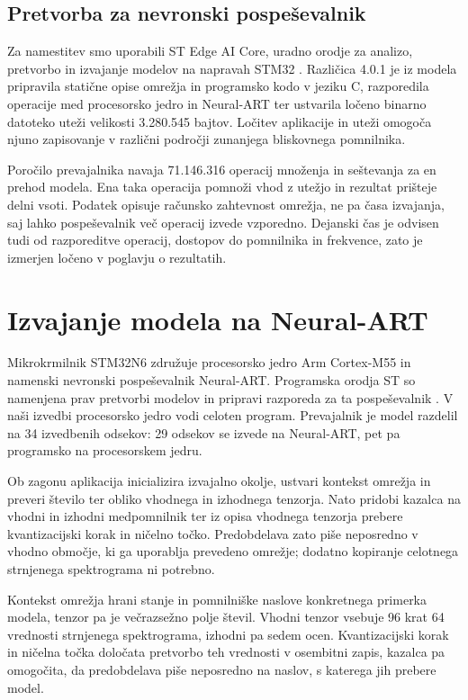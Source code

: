 \subsection{Pretvorba za nevronski pospeševalnik}

Za namestitev smo uporabili ST Edge AI Core, uradno orodje za analizo,
pretvorbo in izvajanje modelov na napravah STM32 \cite{st2026edgeai}. Različica
4.0.1 je iz modela pripravila statične opise omrežja in programsko kodo v
jeziku C, razporedila operacije med procesorsko jedro in Neural-ART ter
ustvarila ločeno binarno datoteko uteži velikosti 3.280.545 bajtov. Ločitev
aplikacije in uteži omogoča njuno zapisovanje v različni področji zunanjega
bliskovnega pomnilnika.

Poročilo prevajalnika navaja 71.146.316 operacij množenja in seštevanja za en
prehod modela. Ena taka operacija pomnoži vhod z utežjo in rezultat prišteje
delni vsoti. Podatek opisuje računsko zahtevnost omrežja, ne pa časa izvajanja,
saj lahko pospeševalnik več operacij izvede vzporedno. Dejanski čas je odvisen
tudi od razporeditve operacij, dostopov do pomnilnika in frekvence, zato je
izmerjen ločeno v poglavju o rezultatih.

\section{Izvajanje modela na Neural-ART}

Mikrokrmilnik STM32N6 združuje procesorsko jedro Arm Cortex-M55 in namenski
nevronski pospeševalnik Neural-ART. Programska orodja ST so namenjena prav
pretvorbi modelov in pripravi razporeda za ta pospeševalnik
\cite{st2026stm32n6ai}. V naši izvedbi procesorsko jedro vodi celoten program.
Prevajalnik je model razdelil na 34 izvedbenih odsekov: 29 odsekov se izvede na
Neural-ART, pet pa programsko na procesorskem jedru.

Ob zagonu aplikacija inicializira izvajalno okolje, ustvari kontekst omrežja in
preveri število ter obliko vhodnega in izhodnega tenzorja. Nato pridobi kazalca
na vhodni in izhodni medpomnilnik ter iz opisa vhodnega tenzorja prebere
kvantizacijski korak in ničelno točko. Predobdelava zato piše neposredno v
vhodno območje, ki ga uporablja prevedeno omrežje; dodatno kopiranje celotnega
strnjenega spektrograma ni potrebno.

Kontekst omrežja hrani stanje in pomnilniške naslove konkretnega primerka
modela, tenzor pa je večrazsežno polje števil. Vhodni tenzor vsebuje 96 krat 64
vrednosti strnjenega spektrograma, izhodni pa sedem ocen. Kvantizacijski korak in ničelna
točka določata pretvorbo teh vrednosti v osembitni zapis, kazalca pa omogočita,
da predobdelava piše neposredno na naslov, s katerega jih prebere model.

